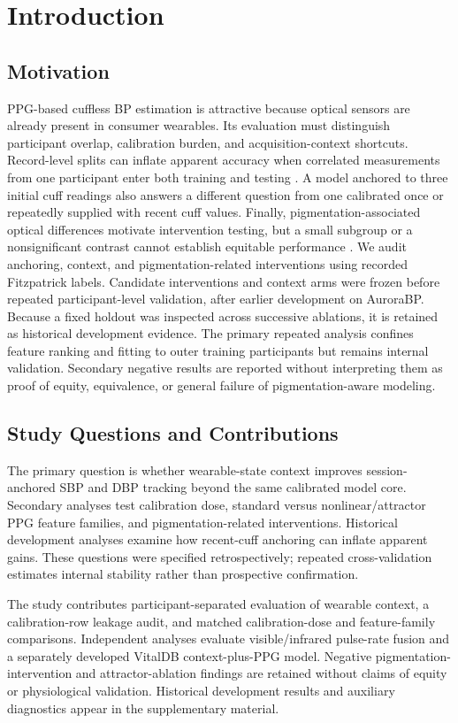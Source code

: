 \documentclass[12pt]{article}
\let\cite\citep
\begin{document}
\section{Introduction}
\label{sec:intro}
\subsection{Motivation}
PPG-based cuffless BP estimation is attractive because optical sensors are already present in consumer wearables. Its evaluation must distinguish participant overlap, calibration burden, and acquisition-context shortcuts. Record-level splits can inflate apparent accuracy when correlated measurements from one participant enter both training and testing \cite{bpbenchmark2023}. A model anchored to three initial cuff readings also answers a different question from one calibrated once or repeatedly supplied with recent cuff values. Finally, pigmentation-associated optical differences motivate intervention testing, but a small subgroup or a nonsignificant contrast cannot establish equitable performance \cite{fitzpatrick2024,jmir2024,phantom2026}.
We audit anchoring, context, and pigmentation-related interventions using recorded Fitzpatrick labels. Candidate interventions and context arms were frozen before repeated participant-level validation, after earlier development on AuroraBP. Because a fixed holdout was inspected across successive ablations, it is retained as historical development evidence. The primary repeated analysis confines feature ranking and fitting to outer training participants but remains internal validation. Secondary negative results are reported without interpreting them as proof of equity, equivalence, or general failure of pigmentation-aware modeling.
\subsection{Study Questions and Contributions}
The primary question is whether wearable-state context improves session-anchored SBP and DBP tracking beyond the same calibrated model core. Secondary analyses test calibration dose, standard versus nonlinear/attractor PPG feature families, and pigmentation-related interventions. Historical development analyses examine how recent-cuff anchoring can inflate apparent gains. These questions were specified retrospectively; repeated cross-validation estimates internal stability rather than prospective confirmation.

The study contributes participant-separated evaluation of wearable context, a calibration-row leakage audit, and matched calibration-dose and feature-family comparisons. Independent analyses evaluate visible/infrared pulse-rate fusion and a separately developed VitalDB context-plus-PPG model. Negative pigmentation-intervention and attractor-ablation findings are retained without claims of equity or physiological validation. Historical development results and auxiliary diagnostics appear in the supplementary material.
\end{document}
